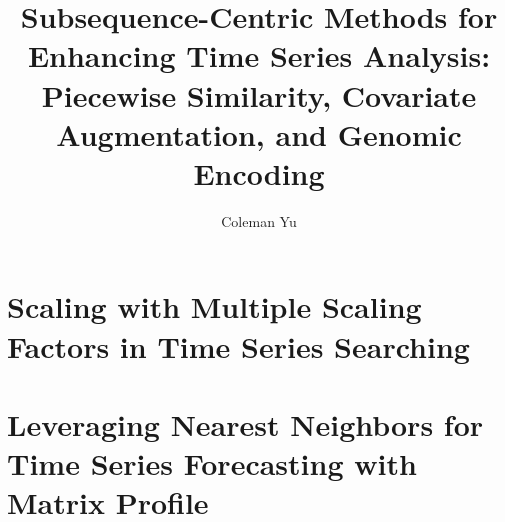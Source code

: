 \documentclass[twoside,openright,12pt]{report}
\title{Subsequence-Centric Methods for Enhancing Time Series Analysis: Piecewise Similarity, Covariate Augmentation, and  Genomic Encoding 
} %
\author{Coleman Yu 
} %
\date{}
\theoremstyle{definition}
\newcommand{\secondpaper}{02-k-scaling-factors-dtw-paper}
\newcommand{\thirdpaper}{03-matrix-profile-motif-forecasting-paper}
\begin{document}

\onehalfspacing


\maketitle
\newpage %
\thispagestyle{empty} %
\mbox{} %

\cleardoublepage
{}

\cleardoublepage
{}
{}

\cleardoublepage
{}
{}

\cleardoublepage
{}
{}
\tableofcontents

\cleardoublepage
{}
{}
\listoffigures

\cleardoublepage
{}
{}
\listoftables

\cleardoublepage
{}



\chapter{Scaling with Multiple Scaling Factors in Time Series Searching} \label{ch:ksfdtw} %








\chapter{Leveraging Nearest Neighbors for Time Series Forecasting with Matrix Profile} \label{ch:mpmf} %








\end{document}
